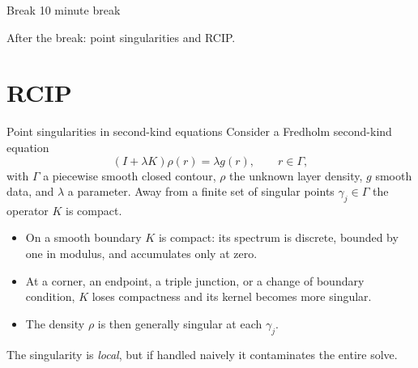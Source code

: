 \documentclass[aspectratio=169,11pt]{beamer}
\begin{document}
\begin{frame}{Break}
\centering
\vspace{18mm}
{\Large 10 minute break}

\vspace{8mm}
After the break: point singularities and RCIP.
\end{frame}

\section{RCIP}

\begin{frame}{Point singularities in second-kind equations}
\small
Consider a Fredholm second-kind equation
\[
  (I+\lambda K)\rho(r)=\lambda g(r),\qquad r\in\Gamma,
\]
with $\Gamma$ a piecewise smooth closed contour, $\rho$ the unknown layer
density, $g$ smooth data, and $\lambda$ a parameter.  Away from a finite set of
singular points $\gamma_j\in\Gamma$ the operator $K$ is compact.

\begin{itemize}
  \item On a smooth boundary $K$ is compact: its spectrum is discrete, bounded
  by one in modulus, and accumulates only at zero.
  \item At a corner, an endpoint, a triple junction, or a change of boundary
  condition, $K$ loses compactness and its kernel becomes more singular.
  \item The density $\rho$ is then generally singular at each $\gamma_j$.
\end{itemize}

\vspace{1mm}
The singularity is \emph{local}, but if handled naively it contaminates the
entire solve.
\end{frame}
\end{document}
